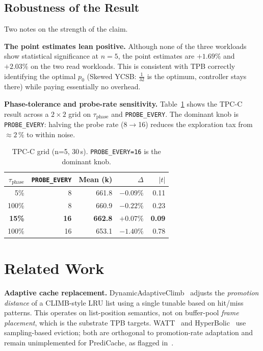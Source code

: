 \documentclass[10pt,twocolumn]{article}
\begin{document}
\subsection{Robustness of the Result}

Two notes on the strength of the claim.

\textbf{The point estimates lean positive.}  Although none of the
three workloads show statistical significance at $n\!=\!5$, the point
estimates are $+1.69\%$ and $+2.03\%$ on the two read workloads.
This is consistent with TPB correctly identifying the optimal $p_0$
(Skewed YCSB: $\tfrac{1}{32}$ is the optimum, controller stays there)
while paying essentially no overhead.

\textbf{Phase-tolerance and probe-rate sensitivity.}  Table~\ref{tab:knobs}
shows the TPC-C result across a $2\!\times\!2$ grid on
$\tau_{\text{phase}}$ and \texttt{PROBE\_EVERY}.  The dominant knob is
\texttt{PROBE\_EVERY}: halving the probe rate (8$\to$16) reduces the
exploration tax from $\approx 2\,\%$ to within noise.

\begin{table}[h]
\centering\small
\caption{TPC-C grid (n=5, 30\,s).  \texttt{PROBE\_EVERY=16} is
  the dominant knob.}
\label{tab:knobs}
\begin{tabular}{rrr rr}
\toprule
$\tau_{\text{phase}}$ & \texttt{PROBE\_EVERY} & Mean (k) & $\Delta$ & $|t|$ \\
\midrule
5\%   & 8  & 661.8 & $-0.09\%$ & 0.11 \\
100\% & 8  & 660.9 & $-0.22\%$ & 0.23 \\
\textbf{15\%}  & \textbf{16} & \textbf{662.8} & $\bm{+0.07\%}$ & \textbf{0.09} \\
100\% & 16 & 653.1 & $-1.40\%$ & 0.78 \\
\bottomrule
\end{tabular}
\end{table}

\section{Related Work}

\textbf{Adaptive cache replacement.}
DynamicAdaptiveClimb~\cite{adaptiveclimb2025} adjusts the
\emph{promotion distance} of a CLIMB-style LRU list using a
single tunable based on hit/miss patterns.  This operates on
list-position semantics, not on buffer-pool \emph{frame placement},
which is the substrate TPB targets.  WATT~\cite{watt}
and HyperBolic~\cite{hyperbolic} use sampling-based eviction; both are
orthogonal to promotion-rate adaptation and remain unimplemented for
PrediCache, as flagged in~\cite{zinsmeister2026predictive}.
\end{document}
